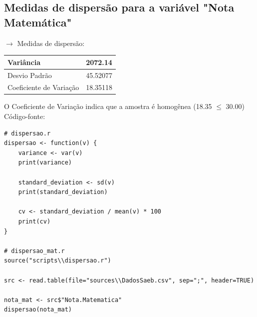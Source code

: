 \documentclass[17pt]{extarticle}
\begin{document}
\subsection{Medidas de dispersão para a variável "Nota Matemática"}
$\rightarrow$ Medidas de dispersão:
\begin{table}[H]
\begin{tabular}{|l|l|}
\hline
Variância   & 2072.14 \\ \hline
Desvio Padrão & 45.52077      \\ \hline
Coeficiente de Variação    & 18.35118      \\ \hline
\end{tabular}
\end{table}
\noindent
O Coeficiente de Variação indica que a amostra é homogênea (18.35 $\le$ 30.00) \\
Código-fonte:
\begin{lstlisting}
# dispersao.r
dispersao <- function(v) {
    variance <- var(v)
    print(variance)

    standard_deviation <- sd(v)
    print(standard_deviation)

    cv <- standard_deviation / mean(v) * 100
    print(cv)
}

# dispersao_mat.r
source("scripts\\dispersao.r")

src <- read.table(file="sources\\DadosSaeb.csv", sep=";", header=TRUE)

nota_mat <- src$"Nota.Matematica"
dispersao(nota_mat)
\end{lstlisting}

\newpage
\end{document}
